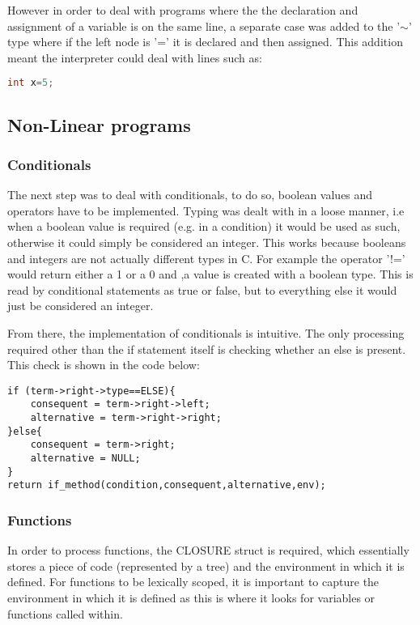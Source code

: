 \documentclass[11pt]{article}
\begin{document}
However in order to deal with programs where the the declaration and assignment of a variable is on the same line, a separate case was added to the '$\sim$' type where if the left node is '=' it is declared and then assigned. This addition meant the interpreter could deal with lines such as:
\begin {lstlisting}[language=C]
int x=5;
\end{lstlisting}
\subsection{Non-Linear programs}

\subsubsection{Conditionals}

The next step was to deal with conditionals, to do so, boolean values and operators have to be implemented. Typing was dealt with in a loose manner, i.e when a boolean value is required (e.g. in a condition) it would be used as such, otherwise it could simply be considered an integer. This works because booleans and integers are not actually different types in C. For example the operator '!=' would return either a 1 or a 0 and ,a value is created with a boolean type. This is read by conditional statements as true or false, but to everything else it would just be considered an integer. 

From there, the implementation of conditionals is intuitive. The only processing required other than the if statement itself is checking whether an else is present. This check is shown in the code below:

\begin{lstlisting}
if (term->right->type==ELSE){
 	consequent = term->right->left;
 	alternative = term->right->right;
}else{
 	consequent = term->right;
 	alternative = NULL;
}
return if_method(condition,consequent,alternative,env);
\end{lstlisting}

\subsubsection{Functions}

In order to process functions, the CLOSURE struct is required, which essentially stores a piece of code (represented by a tree) and the environment in which it is defined. For functions to be lexically scoped, it is important to capture the environment in which it is defined as this is where it  looks for variables or functions called within. 
\end{document}
